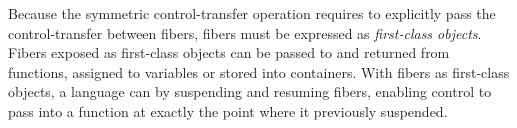 
Because the symmetric control-transfer operation requires to explicitly pass
the control-transfer between fibers, fibers must be expressed as
\emph{first-class objects}.\\

Fibers exposed as first-class objects can be passed to and returned from
functions, assigned to variables or stored into containers. With fibers as
first-class objects, a language can  by suspending and resuming fibers, enabling control to pass into a
function at exactly the point where it previously suspended.\\

